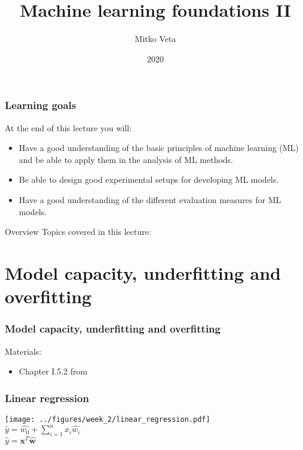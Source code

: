 \documentclass[notes]{beamer}          %
\title{Machine learning foundations II}
\author{Mitko Veta}
\institute{Eindhoven University of Technology

Department of Biomedical Engineering}
\date{2020}
\newcommand{\vect}[1]{\bm{#1}}
\begin{document}
\frame{\titlepage}

\begin{frame}
\frametitle{Learning goals}

At the end of this lecture you will:
\begin{itemize}
    \item Have a good understanding of the basic principles of machine learning (ML) and be able to apply them in the analysis of ML methods.
    \item Be able to design good experimental setups for developing ML models.
    \item Have a good understanding of the different evaluation measures for ML models.
\end{itemize}
\end{frame}

\begin{frame}{Overview}
Topics covered in this lecture:
    \tableofcontents
\end{frame}

\section{Model capacity, underfitting and overfitting}

\begin{frame}
\frametitle{Model capacity, underfitting and overfitting}
Materials:
\begin{itemize}
    \item Chapter I.5.2 from \cite{deeplearning}
\end{itemize}
\end{frame}

\begin{frame}
\frametitle{Linear regression}
    \begin{center}
            \texttt{[image: ../figures/week\_2/linear\_regression.pdf]} \\
            $\hat{y} = \hat{w_0} + \sum_{i=1}^{n} x_i \hat{w_i}$ \\
            $\hat{y} = \vect{x}^T \hat{\vect{w}}$
    \end{center}
\end{frame}
\end{document}
